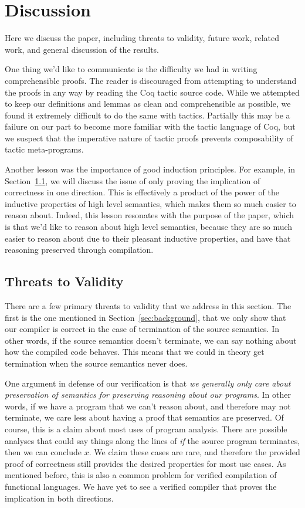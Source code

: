 \section{Discussion} \label{sec:discussion}

Here we discuss the paper, including threats to validity, future work, related
work, and general discussion of the results.

One thing we'd like to communicate is the difficulty we had in writing
comprehensible proofs. The reader is discouraged from attempting to understand
the proofs in any way by reading the Coq tactic source code. While we attempted
to keep our definitions and lemmas as clean and comprehensible as possible, we
found it extremely difficult to do the same with tactics. Partially this may be
a failure on our part to become more familiar with the tactic language of Coq,
but we suspect that the imperative nature of tactic proofs prevents
composability of tactic meta-programs. 

Another lesson was the importance of good induction principles. For example, in
Section~\ref{sec:threats}, we will discuss the issue of only proving the
implication of correctness in one direction. This is effectively a product of
the power of the inductive properties of high level semantics, which makes them
so much easier to reason about. Indeed, this lesson resonates with the purpose
of the paper, which is that we'd like to reason about high level semantics,
because they are so much easier to reason about due to their pleasant inductive
properties, and have that reasoning preserved through compilation. 

\subsection{Threats to Validity} \label{sec:threats}

There are a few primary threats to validity that we address in this section. The
first is the one mentioned in Section~\ref{sec:background}, that we only show
that our compiler is correct in the case of termination of the source semantics.
In other words, if the source semantics doesn't terminate, we can say nothing
about how the compiled code behaves. This means that we could in theory get
termination when the source semantics never does. 

One argument in defense of our verification is that \emph{we generally only care
about preservation of semantics for preserving reasoning about our programs}. In
other words, if we have a program that we can't reason about, and therefore may
not terminate, we care less about having a proof that semantics are preserved.
Of course, this is a claim about most uses of program analysis. There are
possible analyses that could say things along the lines of \emph{if} the source
program terminates, then we can conclude $x$. We claim these cases are rare, and
therefore the provided proof of correctness still provides the desired
properties for most use cases. As mentioned before, this is also a common
problem for verified compilation of functional languages. We have yet to see a
verified compiler that proves the implication in both directions. 

